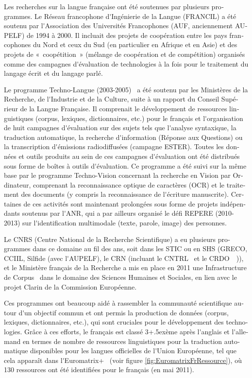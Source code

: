 \documentclass[]{../metanetpaper}
\begin{document}
\begin{french}
\begin{multicols}{2}
Les recherches sur la langue française ont été soutenues par plusieurs
programmes. Le Réseau francophone d{\mbox '}Ingénierie de la Langue
(FRANCIL) a été soutenu par l{\mbox '}Association des Universités
Francophones (AUF, anciennement AUPELF) de 1994 à 2000. Il incluait
des projets de coopération entre les pays francophones du Nord et ceux
du Sud (en particulier en Afrique et en Asie) et des projets de
«~coopétition~» (mélange de coopération et de compétition) organisés comme
des campagnes d{\mbox '}évaluation de technologies à la fois pour le
traitement du langage écrit et du langage parlé.

Le programme Techno-Langue (2003-2005)~\cite{technolangue} a été
soutenu par les Ministères de la Recherche, de l{\mbox '}Industrie et
de la Culture, suite à un rapport du Conseil Supérieur de la Langue
Française. Il comprenait le développement de ressources linguistiques
(corpus, lexiques, dictionnaires, etc.) pour le français et l{\mbox
  '}organisation de huit campagnes d{\mbox '}évaluation sur des sujets
tels que l{\mbox '}analyse syntaxique, la traduction automatique, la
recherche d{\mbox '}information (Réponse aux Questions) ou la
transcription d{\mbox '}émissions radiodiffusées (campagne
ESTER). Toutes les données et outils produits au sein de ces campagnes
d{\mbox '}évaluation ont été distribués sous forme de boîtes à outils
d{\mbox '}évaluation. Ce programme a été suivi sur la même base par le
programme Techno-Vision concernant la recherche en Vision par
Ordinateur, comprenant la reconnaissance optique de caractères (OCR)
et le traitement des documents (y compris la reconnaissance de l{\mbox
  '}écriture manuscrite). Certaines de ces activités sont maintenant
prolongées sous forme de projets indépendants soutenus par l{\mbox
  '}ANR, qui a par ailleurs organisé le défi REPERE (2010-2013) sur
l{\mbox '}identification multimodale (texte, parole, image) des
personnes.

Le CNRS (Centre National de la Recherche Scientifique) a eu plusieurs
programmes dans ce domaine au fil des ans, soit dans les STIC ou en
SHS (GRECO, CCIIL, Silfide (avec l{\mbox '}AUPELF), le CRN (incluant le CNTRL~\cite{cnrtl}
et le CRDO~\cite{crdo}~\cite{crdo2})), et le Ministère français de la Recherche a mis en
place en 2011 une Infrastructure de Corpus~\cite{infracorpus} dans le domaine des
Sciences Humaines et Sociales, en lien avec le projet Clarin de la
Commission Européenne.

Ces programmes ont beaucoup aidé à rassembler la communauté
scientifique autour d{\mbox '}un objectif commun et ont permis la production
de données (corpus, lexiques, dictionnaires, etc.), qui sont cruciales
pour le développement des technologies. Grâce à ces efforts, le
français est classé 3\raise+.5ex\hbox{ème} après l{\mbox '}anglais et l{\mbox '}allemand en termes de
nombre de ressources linguistiques pour la traduction automatique
disponibles pour les langues officielles de l{\mbox '}Union Européenne, tel
que cela apparaît dans l{\mbox '}Euromatrix+~\cite{euromatrixplus} (voir figure \ref{fig:EuromatrixFrRessource}), où 130
ressources ont été identifiées pour le français (en mai 2011).


\end{multicols}
\end{french}
\end{document}
